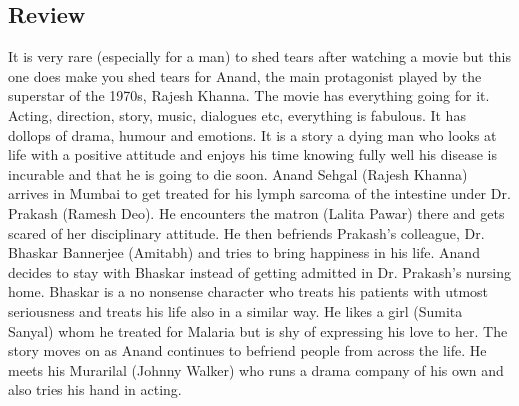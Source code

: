 \documentclass[11pt]{article}
\begin{document}
\subsection*{Review}
It is very rare (especially for a man) to shed tears after watching a movie but this
one does make you shed tears for Anand, the main protagonist played by the superstar
of the 1970s, Rajesh Khanna. The movie has everything going for it. Acting, direction,
story, music, dialogues etc, everything is fabulous. It has dollops of drama, humour 
and emotions. It is a story a dying man who looks at life with a positive attitude 
and enjoys his time knowing fully well his disease is incurable and that he is going
to die soon.
Anand Sehgal (Rajesh Khanna) arrives in Mumbai to get treated for his lymph sarcoma 
of the intestine under Dr. Prakash (Ramesh Deo). He encounters the matron (Lalita Pawar)
there and gets scared of her disciplinary attitude. He then befriends Prakash’s colleague,
Dr. Bhaskar Bannerjee (Amitabh) and tries to bring happiness in his life. Anand decides 
to stay with Bhaskar instead of getting admitted in Dr. Prakash’s nursing home. Bhaskar
is a no nonsense character who treats his patients with utmost seriousness and treats his
life also in a similar way. He likes a girl (Sumita Sanyal) whom he treated for Malaria
but is shy of expressing his love to her. The story moves on as Anand continues to befriend
people from across the life. He meets his Murarilal (Johnny Walker) who runs a drama company
of his own and also tries his hand in acting.
\end{document}
